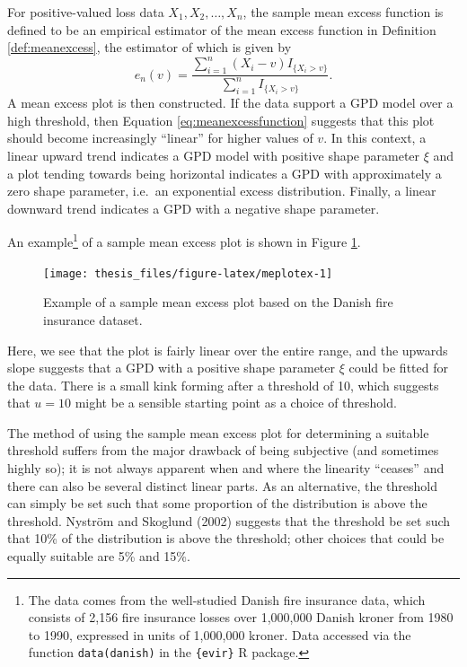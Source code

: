 \documentclass[a4paper,11pt]{article}
\theoremstyle{definition}
\theoremstyle{definition}
\theoremstyle{definition}
\theoremstyle{definition}
\theoremstyle{remark}
\begin{document}
For positive-valued loss data \(X_1, X_2, \dots, X_n\), the sample mean excess function is defined to be an empirical estimator of the mean excess function in Definition \ref{def:meanexcess}, the estimator of which is given by
\begin{equation}
e_{n}(v) = \frac{\sum_{i=1}^{n}(X_i - v)I_{\{X_i > v\}}}{\sum_{i =1}^{n}I_{\{X_i > v\}}}.
\label{eq:meanexcessest}
\end{equation}
A mean excess plot is then constructed. If the data support a GPD model over a high threshold, then Equation \eqref{eq:meanexcessfunction} suggests that this plot should become increasingly ``linear'' for higher values of \(v\). In this context, a linear upward trend indicates a GPD model with positive shape parameter \(\xi\) and a plot tending towards being horizontal indicates a GPD with approximately a zero shape parameter, i.e.~an exponential excess distribution. Finally, a linear downward trend indicates a GPD with a negative shape parameter.

An example\footnote{The data comes from the well-studied Danish fire insurance data, which consists of 2,156 fire insurance losses over 1,000,000 Danish kroner from 1980 to 1990, expressed in units of 1,000,000 kroner. Data accessed via the function \texttt{data(danish)} in the \texttt{\{evir\}} R package.} of a sample mean excess plot is shown in Figure \ref{fig:meplotex}.
\begin{figure}[H]

{\centering \texttt{[image: thesis\_files/figure-latex/meplotex-1]} 

}

\caption{Example of a sample mean excess plot based on the Danish fire insurance dataset.}\label{fig:meplotex}
\end{figure}
Here, we see that the plot is fairly linear over the entire range, and the upwards slope suggests that a GPD with a positive shape parameter \(\xi\) could be fitted for the data. There is a small kink forming after a threshold of 10, which suggests that \(u = 10\) might be a sensible starting point as a choice of threshold.

The method of using the sample mean excess plot for determining a suitable threshold suffers from the major drawback of being subjective (and sometimes highly so); it is not always apparent when and where the linearity ``ceases'' and there can also be several distinct linear parts. As an alternative, the threshold can simply be set such that some proportion of the distribution is above the threshold. Nyström and Skoglund (2002) suggests that the threshold be set such that 10\% of the distribution is above the threshold; other choices that could be equally suitable are 5\% and 15\%.
\end{document}
